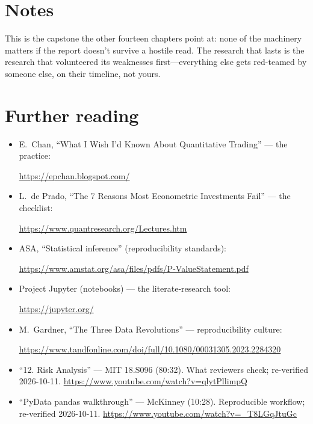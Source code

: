 \section*{Notes}
This is the capstone the other fourteen chapters point at: none of the machinery matters
if the report doesn't survive a hostile read. The research that lasts is the research
that volunteered its weaknesses first---everything else gets red-teamed by someone else,
on their timeline, not yours.

\section*{Further reading}
\begin{itemize}
\item E.~Chan, ``What I Wish I'd Known About Quantitative Trading'' --- the practice:

\url{https://epchan.blogspot.com/}
\item L.~de Prado, ``The 7 Reasons Most Econometric Investments Fail'' --- the checklist:

\url{https://www.quantresearch.org/Lectures.htm}
\item ASA, ``Statistical inference'' (reproducibility standards):

\url{https://www.amstat.org/asa/files/pdfs/P-ValueStatement.pdf}
\item Project Jupyter (notebooks) --- the literate-research tool:

\url{https://jupyter.org/}
\item M.~Gardner, ``The Three Data Revolutions'' --- reproducibility culture:

\url{https://www.tandfonline.com/doi/full/10.1080/00031305.2023.2284320}
\end{itemize}

\begin{rulebox}
\begin{itemize}
\item ``12. Risk Analysis'' --- MIT 18.S096 (80:32). What reviewers check; re-verified
2026-10-11.
\url{https://www.youtube.com/watch?v=qlytPllimpQ}
\item ``PyData pandas walkthrough'' --- McKinney (10:28). Reproducible workflow;
re-verified 2026-10-11.
\url{https://www.youtube.com/watch?v=_T8LGqJtuGc}
\end{itemize}
\end{rulebox}
